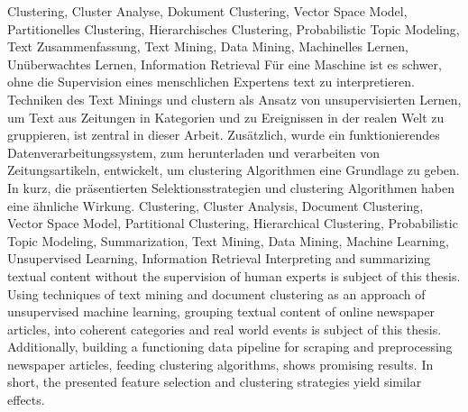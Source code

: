 \HAWAbstractPage
  {
    Clustering, Cluster Analyse, 
    Dokument Clustering, Vector Space Model,
    Partitionelles Clustering,
    Hierarchisches Clustering,
    Probabilistic Topic Modeling, 
    Text Zusammenfassung,
    Text Mining, Data Mining,
    Machinelles Lernen, Unüberwachtes Lernen, 
    Information Retrieval
  }
  { 
    Für eine Maschine ist es schwer, ohne die Supervision eines menschlichen Expertens text zu interpretieren. Techniken des Text Minings und clustern als Ansatz von unsupervisierten Lernen, um Text aus Zeitungen in Kategorien und zu Ereignissen in der realen Welt zu gruppieren, ist zentral in dieser Arbeit. Zusätzlich, wurde ein funktionierendes Datenverarbeitungssystem, zum herunterladen und verarbeiten von Zeitungsartikeln, entwickelt, um clustering Algorithmen eine Grundlage zu geben. In kurz, die präsentierten Selektionsstrategien und clustering Algorithmen haben eine ähnliche Wirkung.
  }
  { 
    Clustering, Cluster Analysis, 
    Document Clustering, Vector Space Model,
    Partitional Clustering,
    Hierarchical Clustering,
    Probabilistic Topic Modeling,
    Summarization,
    Text Mining, Data Mining,
    Machine Learning, Unsupervised Learning, 
    Information Retrieval
  }
  {
    Interpreting and summarizing textual content without the supervision of human experts is subject of this thesis. Using techniques of text mining and document clustering as an approach of unsupervised machine learning, grouping textual content of online newspaper articles, into coherent categories and real world events is subject of this thesis. Additionally, building a functioning data pipeline for scraping and preprocessing newspaper articles, feeding clustering algorithms, shows promising results. In short, the presented feature selection and clustering strategies yield similar effects.
  }



